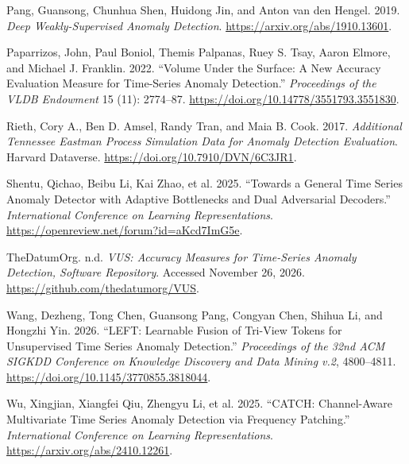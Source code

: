 \documentclass[
  english,
  10pt,
]{article}
\newlength{\cslhangindent}
\newenvironment{CSLReferences}[2] %
 {\begin{list}{}{%
  \setlength{\itemindent}{0pt}
  \setlength{\leftmargin}{0pt}
  \setlength{\parsep}{0pt}
  \ifodd #1
   \setlength{\leftmargin}{\cslhangindent}
   \setlength{\itemindent}{-1\cslhangindent}
  \fi
  \setlength{\itemsep}{#2\baselineskip}}}
 {\end{list}}
\begin{document}
\begin{CSLReferences}{1}{1}
Pang, Guansong, Chunhua Shen, Huidong Jin, and Anton van den Hengel.
2019. \emph{Deep Weakly-Supervised Anomaly Detection}.
\url{https://arxiv.org/abs/1910.13601}.

Paparrizos, John, Paul Boniol, Themis Palpanas, Ruey S. Tsay, Aaron
Elmore, and Michael J. Franklin. 2022. {``Volume Under the Surface: A
New Accuracy Evaluation Measure for Time-Series Anomaly Detection.''}
\emph{Proceedings of the VLDB Endowment} 15 (11): 2774--87.
\url{https://doi.org/10.14778/3551793.3551830}.

Rieth, Cory A., Ben D. Amsel, Randy Tran, and Maia B. Cook. 2017.
\emph{Additional Tennessee Eastman Process Simulation Data for Anomaly
Detection Evaluation}. Harvard Dataverse.
\url{https://doi.org/10.7910/DVN/6C3JR1}.

Shentu, Qichao, Beibu Li, Kai Zhao, et al. 2025. {``Towards a General
Time Series Anomaly Detector with Adaptive Bottlenecks and Dual
Adversarial Decoders.''} \emph{International Conference on Learning
Representations}. \url{https://openreview.net/forum?id=aKcd7ImG5e}.

TheDatumOrg. n.d. \emph{{VUS}: Accuracy Measures for Time-Series Anomaly
Detection, Software Repository}. Accessed November 26, 2026.
\url{https://github.com/thedatumorg/VUS}.

Wang, Dezheng, Tong Chen, Guansong Pang, Congyan Chen, Shihua Li, and
Hongzhi Yin. 2026. {``{LEFT}: Learnable Fusion of Tri-View Tokens for
Unsupervised Time Series Anomaly Detection.''} \emph{Proceedings of the
32nd ACM SIGKDD Conference on Knowledge Discovery and Data Mining v.2},
4800--4811. \url{https://doi.org/10.1145/3770855.3818044}.

Wu, Xingjian, Xiangfei Qiu, Zhengyu Li, et al. 2025. {``{CATCH}:
Channel-Aware Multivariate Time Series Anomaly Detection via Frequency
Patching.''} \emph{International Conference on Learning
Representations}. \url{https://arxiv.org/abs/2410.12261}.

\end{CSLReferences}
\end{document}
